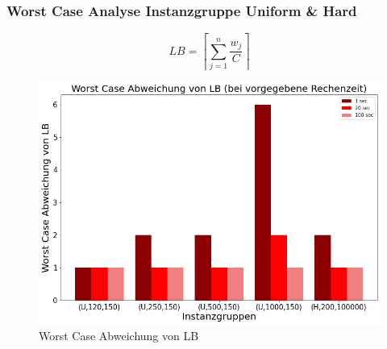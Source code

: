 \documentclass{beamer}
\begin{document}
\begin{frame}

\frametitle{Worst Case Analyse Instanzgruppe Uniform \& Hard}
\begin{footnotesize}
\begin{equation}
LB = \left\lceil\sum_{j=1}^{n} \frac{w_j}{C}\right\rceil
\end{equation}
\end{footnotesize}
\begin{figure}[!htbp]
\begin{center}
\includegraphics[scale=0.3]{img/wc_unif_hard.png}
\end{center}
\caption{Worst Case Abweichung von LB}
\label{fig:WC}
\end{figure}



\end{frame}
\end{document}
